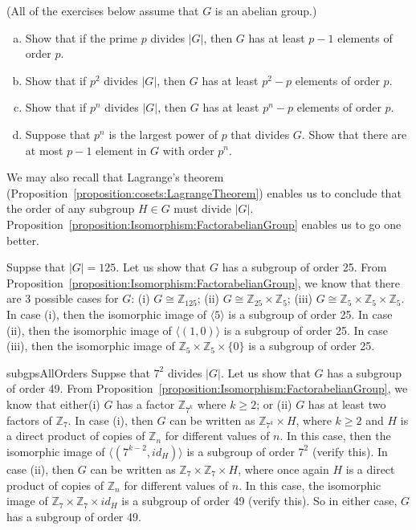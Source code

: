 \begin{exercise}{}
(All of the exercises below assume that $G$ is an abelian group.)
\begin{enumerate}[(a)]
\item
Show that if the prime $p$ divides $|G|$, then $G$ has at least $p-1$ elements of order $p$.
\item
Show that if $p^2$ divides $|G|$, then $G$ has at least $p^2 - p$ elements of order $p$.
\item
Show that if $p^n$ divides $|G|$, then $G$ has at least $p^n - p$ elements of order $p$.
\item
Suppose that $p^n$ is the largest power of $p$ that divides $G$. Show that there are at most $p-1$ element in $G$ with order $p^n$. 
\end{enumerate}
\end{exercise}

We may also recall that Lagrange's theorem  (Proposition~\ref{proposition:cosets:LagrangeTheorem})  enables us to conclude that the order of any subgroup $H \in G$ must divide $|G|$.   Proposition~\ref{proposition:Isomorphism:FactorabelianGroup} enables us to go one better.

\begin{example}{}
 Suppse that $|G| = 125.$  Let us show that $G$ has a subgroup of order 25.  From Proposition~\ref{proposition:Isomorphism:FactorabelianGroup}, we know that there are 3 possible cases for $G$:  (i) $G \cong {\mathbb Z}_{125}$; (ii) $G \cong {\mathbb Z}_{25} \times {\mathbb Z}_5$; (iii) $G \cong {\mathbb Z}_5 \times {\mathbb Z}_5 \times {\mathbb Z}_5$.  In case (i), then the isomorphic image of $\langle 5 \rangle$ is a subgroup of order 25.  In case (ii), then the isomorphic image of $\langle (1,0) \rangle$ is a subgroup of order 25.  In case (iii), then the isomorphic image of ${\mathbb Z}_5 \times {\mathbb Z}_5 \times \{0\}$ is a subgroup of order 25.
 \end{example}

\begin{example}{subgpsAllOrders}
 Suppse that $7^2$ divides $|G|$.  Let us show that $G$ has a subgroup of order 49.  From Proposition~\ref{proposition:Isomorphism:FactorabelianGroup}, we know that either(i) $G$ has a factor ${\mathbb Z}_{7^k}$ where $k \ge 2$;  or (ii) $G$ has at least two factors of ${\mathbb Z}_7$. In case (i), then $G$ can be written as ${\mathbb Z}_{7^k} \times H$, where $k \ge 2$ and $H$ is a direct product of copies of ${\mathbb Z_n}$ for different values of $n$.  In this case, then the isomorphic image of $\langle (7^{k-2},id_H) \rangle$ is a subgroup of order $7^2$ (verify this). In case (ii), then $G$ can be written as ${\mathbb Z}_7 \times {\mathbb Z}_7 \times  H$, where once again $H$  is a direct product of copies of ${\mathbb Z_n}$ for different values of $n$. In this case, the isomorphic image of 
 ${\mathbb Z}_7 \times {\mathbb Z}_7 \times  id_H$ is a subgroup of order 49 (verify this).  So in either case, $G$ has a subgroup of order 49.
 \end{example}

